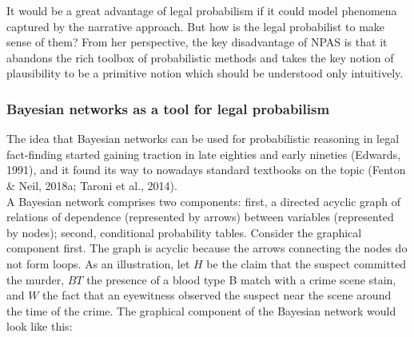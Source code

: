 \documentclass[11pt,dvipsnames,enabledeprecatedfontcommands]{scrartcl}
\begin{document}
It would be a great advantage of legal probabilism if it could model
phenomena captured by the narrative approach. But how is the legal
probabilist to make sense of them? From her perspective, the key
disadvantage of NPAS is that it abandons the rich toolbox of
probabilistic methods and takes the key notion of plausibility to be a
primitive notion which should be understood only intuitively.

\subsubsection{Bayesian networks as a tool for legal
probabilism}\label{bayesian-networks-as-a-tool-for-legal-probabilism}

The idea that Bayesian networks can be used for probabilistic reasoning
in legal fact-finding started gaining traction in late eighties and
early nineties (Edwards, 1991), and it found its way to nowadays
standard textbooks on the topic (Fenton \& Neil, 2018a; Taroni et al.,
2014).\\
A Bayesian network comprises two components: first, a directed acyclic
graph of relations of dependence (represented by arrows) between
variables (represented by nodes); second, conditional probability
tables. Consider the graphical component first. The graph is acyclic
because the arrows connecting the nodes do not form loops. As an
illustration, let \(H\) be the claim that the suspect committed the
murder, \(BT\) the presence of a blood type B match with a crime scene
stain, and \(W\) the fact that an eyewitness observed the suspect near
the scene around the time of the crime. The graphical component of the
Bayesian network would look like this:

\noindent
\end{document}
